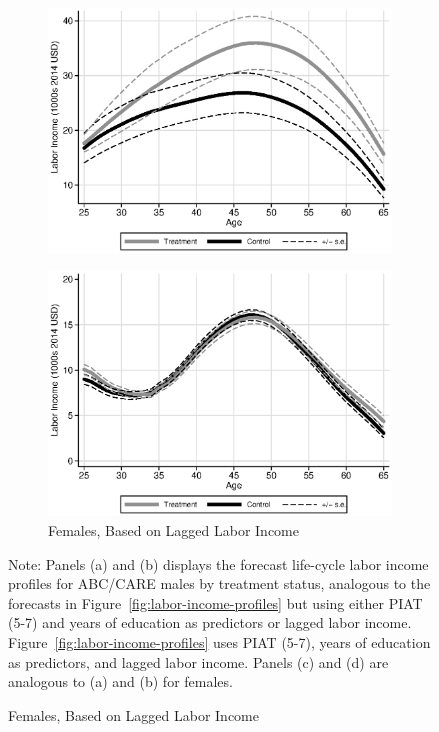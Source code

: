 \begin{figure}
\begin{subfigure}[h]{0.35\textwidth}
		\includegraphics[width=\textwidth]{output/labor_25-60_female_2}
\end{subfigure}%
\begin{subfigure}[h]{0.35\textwidth}
		\centering
		\caption{Females, Based on Lagged Labor Income}
		\includegraphics[width=\textwidth]{output/labor_25-60_female_3}
\end{subfigure}
\footnotesize \justify
Note: Panels (a) and (b) displays the forecast life-cycle labor income profiles for ABC/CARE males by treatment status, analogous to the forecasts in Figure~\ref{fig:labor-income-profiles} but using either PIAT (5-7) and years of education as predictors or lagged labor income. Figure~\ref{fig:labor-income-profiles} uses PIAT (5-7), years of education as predictors, and lagged labor income. Panels (c) and (d) are analogous to (a) and (b) for females.
\end{figure}

\pagebreak


\singlespace




